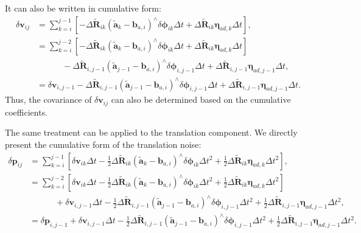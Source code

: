 It can also be written in cumulative form:
\begin{equation}\label{key}
	\begin{aligned}
		\delta \mathbf{v}_{ij} &= \sum_{k=i}^{j-1} \left[ -\Delta \tilde{\mathbf{R}}_{ik}(\tilde{\mathbf{a}}_k 
		-\mathbf{b}_{a,i})^\wedge \delta \boldsymbol{\phi}_{ik} \Delta t + \Delta \tilde{\mathbf{R}}_{ik} 
		\boldsymbol{\eta}_{ad,k} \Delta t \right], \\
		&= \sum_{k=i}^{j-2} \left[ -\Delta \tilde{\mathbf{R}}_{ik}(\tilde{\mathbf{a}}_k -\mathbf{b}_{a,i})^\wedge \delta 
		\boldsymbol{\phi}_{ik} \Delta t + \Delta \tilde{\mathbf{R}}_{ik} \boldsymbol{\eta}_{ad,k} \Delta t 
		\right] \\ 
		& \quad \quad \quad - \Delta \tilde{\mathbf{R}}_{i, j-1} (\tilde{\mathbf{a}}_{j-1} -\mathbf{b}_{a,i})^\wedge 
		\delta \boldsymbol{\phi}_{i, j-1} \Delta t + \Delta \tilde{\mathbf{R}}_{i,j-1} \boldsymbol{\eta}_{ad, j-1} 
		\Delta t, \\
		&= \delta \mathbf{v}_{i, j-1} - \Delta \tilde{\mathbf{R}}_{i,j-1} (\tilde{\mathbf{a}}_{j-1} -\mathbf{b}_{a, i})^\wedge 
		\delta \boldsymbol{\phi}_{i, j-1} \Delta t + \Delta \tilde{\mathbf{R}}_{i, j-1} \boldsymbol{\eta}_{ad, j-1} 
		\Delta t.
	\end{aligned}
\end{equation}
Thus, the covariance of $\delta \mathbf{v}_{ij}$ can also be determined based on the cumulative coefficients.

The same treatment can be applied to the translation component. We directly present the cumulative form of the translation noise:
\begin{equation}\label{key}
	\begin{aligned}
		\delta \mathbf{p}_{ij} &= \sum_{k=i}^{j-1} \left[ \delta \mathbf{v}_{ik} \Delta t - \frac{1}{2} \Delta 
		\tilde{\mathbf{R}}_{ik} (\tilde{\mathbf{a}}_k - \mathbf{b}_{a,i})^\wedge \delta \boldsymbol{\phi}_{ik} \Delta 
		t^2 + \frac{1}{2} \Delta \tilde{\mathbf{R}}_{ik} \boldsymbol{\eta}_{ad,k} \Delta t^2 \right], \\
		&= \sum_{k=i}^{j-2} \left[  \delta \mathbf{v}_{ik} \Delta t - \frac{1}{2} \Delta \tilde{\mathbf{R}}_{ik} 
		(\tilde{\mathbf{a}}_k - \mathbf{b}_{a,i})^\wedge \delta \boldsymbol{\phi}_{ik} \Delta t^2 + \frac{1}{2} 
		\Delta \tilde{\mathbf{R}}_{ik} \boldsymbol{\eta}_{ad,k} \Delta t^2 \right] \\
		& \quad \quad \quad + \delta \mathbf{v}_{i, j-1} \Delta t - \frac{1}{2} \Delta \tilde{\mathbf{R}}_{i, j-1}  
		(\tilde{\mathbf{a}}_{j-1} - \mathbf{b}_{a,i})^\wedge \delta \boldsymbol{\phi}_{i,j-1} \Delta t^2 + 
		\frac{1}{2} \Delta \tilde{\mathbf{R}}_{i,j-1} \boldsymbol{\eta}_{ad, j-1} \Delta t^2, \\
		&= \delta \mathbf{p}_{i,j-1} + \delta \mathbf{v}_{i,j-1} \Delta t - \frac{1}{2} \Delta \tilde{\mathbf{R}}_{i, j-1}  
		(\tilde{\mathbf{a}}_{j-1} - \mathbf{b}_{a,i})^\wedge \delta \boldsymbol{\phi}_{i,j-1} \Delta t^2 + 
		\frac{1}{2} \Delta \tilde{\mathbf{R}}_{i,j-1} \boldsymbol{\eta}_{ad, j-1} \Delta t^2 .
	\end{aligned}
\end{equation}

